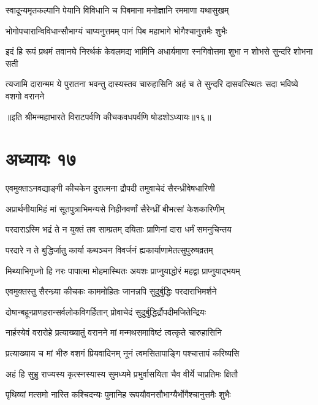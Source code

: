 \twolineshloka
{स्वादून्यमृतकल्पानि पेयानि विविधानि च}
{पिबमाना मनोज्ञानि रममाणा यथासुखम्}


\twolineshloka
{भोगोपचारान्विविधान्सौभाग्यं चाप्यनुत्तमम्}
{पानं पिब महाभागे भोगैश्चानुत्तमैः शुभैः}


\twolineshloka
{इदं हि रूपं प्रथमं तवानघे निरर्थकं केवलमद्य भामिनि}
{अधार्यमाणा स्नगिवोत्तमा शुभा न शोभसे सुन्दरि शोभना सती}


\twolineshloka
{त्यजामि दारान्मम ये पुरातना भवन्तु दास्यस्तव चारुहासिनि}
{अहं च ते सुन्दरि दासवत्स्थितः सदा भविष्ये वशगो वरानने}

॥इति श्रीमन्महाभारते विराटपर्वणि कीचकवधपर्वणि षोडशोऽध्यायः॥१६॥

\chapter{अध्यायः १७}

\twolineshloka
{एवमुक्ताऽनवद्याङ्गी कीचकेन दुरात्मना}
{द्रौपदी तमुवाचेदं सैरन्ध्रीवेषधारिणी}


\twolineshloka
{अप्रार्थनीयामिहं मां सूतपुत्राभिमन्यसे}
{निहीनवर्णां सैरेन्ध्रीं बीभत्सां केशकारिणीम्}


\twolineshloka
{परदाराऽस्मि भद्रं ते न युक्तं तव साम्प्रतम्}
{दयिताः प्राणिनां दारा धर्मं समनुचिन्तय}


\twolineshloka
{परदारे न ते बुद्धिर्जातु कार्या कथञ्चन}
{विवर्जनं ह्यकार्याणामेतत्सुपुरुषव्रतम्}


\twolineshloka
{मिथ्याभिगृध्नो हि नरः पापात्मा मोहमास्थितः}
{अयशः प्राप्नुयाद्धोरं महद्वा प्राप्नुयाद्भयम्}



\twolineshloka
{एवमुक्तस्तु सैरन्ध्र्या कीचकः काममोहितः}
{जानन्नपि सुदुर्बुद्धिः परदाराभिमर्शने}


\twolineshloka
{दोषान्बहून्प्राणहरान्सर्वलोकविगर्हितान्}
{प्रोवाचेदं सुदुर्बुद्धिर्द्रौपदीमजितेन्द्रियः}


\twolineshloka
{नार्हस्येवं वरारोहे प्रत्याख्यातुं वरानने}
{मां मन्मथसमाविष्टं त्वत्कृते चारुहासिनि}


\twolineshloka
{प्रत्याख्याय च मां भीरु वशगं प्रियवादिनम्}
{नूनं त्वमसितापाङ्गि पश्चात्तापं करिष्यसि}


\twolineshloka
{अहं हि सुभ्रु राज्यस्य कृत्स्नस्यास्य सुमध्यमे}
{प्रभुर्वासयिता चैव वीर्ये चाप्रतिमः क्षितौ}


\twolineshloka
{पृथिव्यां मत्समो नास्ति कश्चिदन्यः पुमानिह}
{रूपयौवनसौभाग्यैर्भोगैश्चानुत्तमैः शुभैः}


